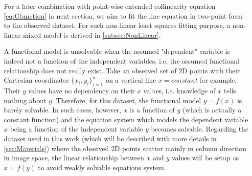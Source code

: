 For a later combination with point-wise extended collinearity equation \eqref{eq:Gfunction} in next section, we aim to fit the line equation in two-point form to the observed dataset. 
For such non-linear least squares fitting purpose, a non-linear mixed model is derived in \cref{subsec:NonLinear}. %

A functional model is unsolvable when the assumed "dependent" variable is indeed not a function of the independent variables, i.e. the assumed functional relationship does not really exist. Take an observed set of 2D points with their Cartesian coordinates $\{x_i,y_i\}^n_{i=1}$ on a vertical line $x=constant$ for example. Their $y$ values have no dependency on their $x$ values, i.e. knowledge of $x$ tells nothing about $y$. Therefore, for this dataset, the functional model $y=f(x)$ is barely solvable. In such cases, however, $x$ is a function of $y$ (which is actually a constant function) and the equation system which models the dependent variable $x$ being a function of the independent variable $y$ becomes solvable. Regarding the dataset used in this work (which will be described with more details in \cref{sec:Materials}) where the observed 2D points scatter mainly in column direction in image space, the linear relationship between $x$ and $y$ values will be setup as $x=f(y)$ to avoid weakly solvable equations system.






